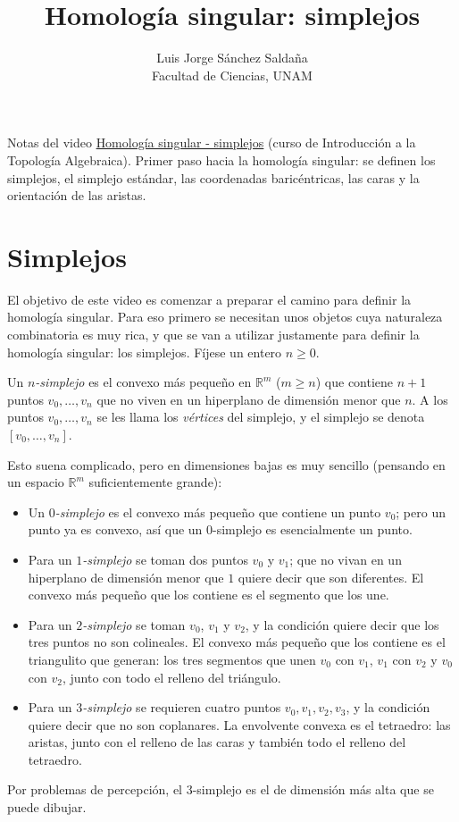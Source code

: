 \documentclass[11pt]{article}
\title{Homología singular: simplejos}
\author{Luis Jorge Sánchez Saldaña\\[2pt]\small Facultad de Ciencias, UNAM}
\date{}
\begin{document}
\maketitle

\noindent\small Notas del video
\href{https://www.youtube.com/watch?v=5wVdLJQrJBI}{\guillemotleft{}Homología singular - simplejos\guillemotright{}}
(curso de Introducción a la Topología Algebraica). Primer paso hacia la homología singular: se definen los simplejos, el simplejo estándar, las coordenadas baricéntricas, las caras y la orientación de las aristas.
\normalsize

\section*{Simplejos}

El objetivo de este video es comenzar a preparar el camino para definir la homología singular. Para eso primero se necesitan unos objetos cuya naturaleza combinatoria es muy rica, y que se van a utilizar justamente para definir la homología singular: los simplejos. Fíjese un entero $n\ge 0$.

\begin{defn}[Simplejo]\label{defn:simplejo}
Un \emph{$n$-simplejo} es el convexo más pequeño en $\mathbb R^m$ ($m\ge n$) que contiene $n+1$ puntos $v_0,\dots,v_n$ que no viven en un hiperplano de dimensión menor que $n$. A los puntos $v_0,\dots,v_n$ se les llama los \emph{vértices} del simplejo, y el simplejo se denota $[v_0,\dots,v_n]$.
\end{defn}

Esto suena complicado, pero en dimensiones bajas es muy sencillo (pensando en un espacio $\mathbb R^m$ suficientemente grande):
\begin{itemize}
  \item Un \emph{$0$-simplejo} es el convexo más pequeño que contiene un punto $v_0$; pero un punto ya es convexo, así que un $0$-simplejo es esencialmente un punto.
  \item Para un \emph{$1$-simplejo} se toman dos puntos $v_0$ y $v_1$; que no vivan en un hiperplano de dimensión menor que $1$ quiere decir que son diferentes. El convexo más pequeño que los contiene es el segmento que los une.
  \item Para un \emph{$2$-simplejo} se toman $v_0$, $v_1$ y $v_2$, y la condición quiere decir que los tres puntos no son colineales. El convexo más pequeño que los contiene es el triangulito que generan: los tres segmentos que unen $v_0$ con $v_1$, $v_1$ con $v_2$ y $v_0$ con $v_2$, junto con todo el relleno del triángulo.
  \item Para un \emph{$3$-simplejo} se requieren cuatro puntos $v_0,v_1,v_2,v_3$, y la condición quiere decir que no son coplanares. La envolvente convexa es el tetraedro: las aristas, junto con el relleno de las caras y también todo el relleno del tetraedro.
\end{itemize}
Por problemas de percepción, el $3$-simplejo es el de dimensión más alta que se puede dibujar.
\end{document}

